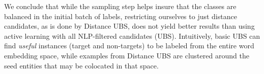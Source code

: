 We conclude that while the sampling step
helps insure that the classes are balanced in the initial batch of labels, 
restricting ourselves to just distance candidates, as is done by Distance UBS, does not yield better results than using active learning with all NLP-filtered candidates (UBS).
Intuitively, basic UBS can find \textit{useful} instances (target and non-targets) to be labeled from the entire word embedding space, 
while examples from Distance UBS are clustered around the seed entities that may be colocated in that space.


